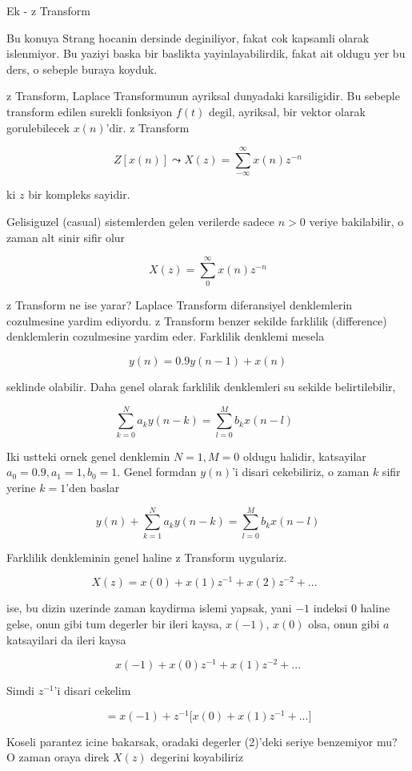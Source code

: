 \documentclass[12pt,fleqn]{article}
\begin{document}
Ek - z Transform 

Bu konuya Strang hocanin dersinde deginiliyor, fakat cok kapsamli olarak
islenmiyor. Bu yaziyi baska bir baslikta yayinlayabilirdik, fakat ait
oldugu yer bu ders, o sebeple buraya koyduk.

z Transform, Laplace Transformunun ayriksal dunyadaki karsiligidir. Bu
sebeple transform edilen surekli fonksiyon $f(t)$ degil, ayriksal, bir
vektor olarak gorulebilecek $x(n)$'dir. z Transform

\[ Z[x(n)] \leadsto X(z) = \sum_{-\infty}^{\infty} x(n)z^{-n}  \]

ki $z$ bir kompleks sayidir. 

Gelisiguzel (casual) sistemlerden gelen verilerde sadece $n>0$ veriye
bakilabilir, o zaman alt sinir sifir olur

\[ X(z) = \sum_{0}^{\infty} x(n)z^{-n}  \]

z Transform ne ise yarar? Laplace Transform diferansiyel denklemlerin
cozulmesine yardim ediyordu. z Transform benzer sekilde farklilik
(difference) denklemlerin cozulmesine yardim eder. Farklilik denklemi
mesela

\[ y(n) = 0.9 y(n-1) + x(n) \]

seklinde olabilir. Daha genel olarak farklilik denklemleri su sekilde
belirtilebilir,

\[ \sum_{k=0}^N a_k y(n-k) = \sum_{l=0}^M b_k x(n-l) 
\ \ \ \label{1}
\]

Iki ustteki ornek genel denklemin $N=1,M=0$ oldugu halidir, katsayilar 
$a_0
= 0.9,a_1=1,b_0=1$. Genel formdan $y(n)$'i disari cekebiliriz, o zaman $k$
sifir yerine $k=1$'den baslar

\[ y(n) + \sum_{k=1}^N a_k y(n-k) = \sum_{l=0}^M b_k x(n-l) \]

Farklilik denkleminin genel haline z Transform uygulariz. 

\[ X(z) = x(0) + x(1)z^{-1} + x(2) z^{-2} + ... 
\ \ \ \label{2}
\]

ise, bu dizin uzerinde zaman kaydirma islemi yapsak, yani $-1$ indeksi $0$
haline gelse, onun gibi tum degerler bir ileri kaysa, $x(-1)$, $x(0)$ olsa,
onun gibi $a$ katsayilari da ileri kaysa

\[ x(-1) + x(0)z^{-1} + x(1) z^{-2} + ...\]

Simdi $z^{-1}$'i disari cekelim

\[ = x(-1) + z^{-1} \bigg[ x(0) + x(1) z^{-1} + ... \bigg] \]

Koseli parantez icine bakarsak, oradaki degerler (2)'deki seriye benzemiyor
mu? O zaman oraya direk $X(z)$ degerini koyabiliriz
\end{document}
